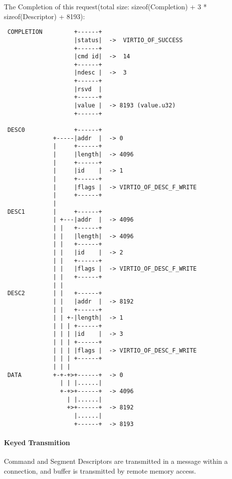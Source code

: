 The Completion of this request(total size: sizeof(Completion) + 3 * sizeof(Descriptor) + 8193):
\begin{lstlisting}
 COMPLETION         +------+
                    |status|  ->  VIRTIO_OF_SUCCESS
                    +------+
                    |cmd id|  ->  14
                    +------+
                    |ndesc |  ->  3
                    +------+
                    |rsvd  |
                    +------+
                    |value |  -> 8193 (value.u32)
                    +------+

 DESC0              +------+
              +-----|addr  |  -> 0
              |     +------+
              |     |length|  -> 4096
              |     +------+
              |     |id    |  -> 1
              |     +------+
              |     |flags |  -> VIRTIO_OF_DESC_F_WRITE
              |     +------+
              |
 DESC1        |     +------+
              | +---|addr  |  -> 4096
              | |   +------+
              | |   |length|  -> 4096
              | |   +------+
              | |   |id    |  -> 2
              | |   +------+
              | |   |flags |  -> VIRTIO_OF_DESC_F_WRITE
              | |   +------+
              | |
 DESC2        | |   +------+
              | |   |addr  |  -> 8192
              | |   +------+
              | | +-|length|  -> 1
              | | | +------+
              | | | |id    |  -> 3
              | | | +------+
              | | | |flags |  -> VIRTIO_OF_DESC_F_WRITE
              | | | +------+
              | | |
 DATA         +-+-+>+------+  -> 0
                | | |......|
                +-+>+------+  -> 4096
                  | |......|
                  +>+------+  -> 8192
                    |......|
                    +------+  -> 8193
\end{lstlisting}

\paragraph{Keyed Transmition}\label{sec:Virtio Transport Options / Virtio Over Fabrics / Transmition Protocol / Commands Definition / Keyed Transmition}
Command and Segment Descriptors are transmitted in a message within a connection, and buffer is transmitted by remote memory access.

